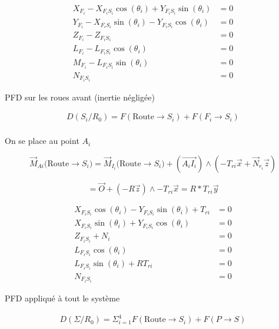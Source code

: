 \documentclass[a4paper,12pt]{report}  %
\begin{document}
\begin{align*}
	X_{F_i} - X_{F_iS_i} \cos(\theta_i) + Y_{F_iS_i} \sin(\theta_i) &= 0 \tag{7} \\
	Y_{F_i} - X_{F_iS_i} \sin(\theta_i) - Y_{F_iS_i} \cos(\theta_i) &= 0 \tag{8} \\
	Z_{F_i} - Z_{F_iS_i} &= 0 \tag{9} \\
	L_{F_i} - L_{F_iS_i} \cos(\theta_i) &= 0 \tag{10} \\
	M_{F_i} - L_{F_iS_i} \sin(\theta_i) &= 0 \tag{11} \\
	N_{F_iS_i} &= 0 \tag{12}
\end{align*}




PFD sur les roues avant (inertie négligée)



\begin{align*}
	D(S_i/R_0) = {F}(\text{Route} \rightarrow S_i) + {F}(F_i \rightarrow S_i) \\
\end{align*}



On se place au point $A_i$



$$
\vec{M}_{Ai}({\text{Route} \rightarrow S_i)} = \vec{M}_{I_i}({\text{Route}\rightarrow S_i)} + \left( \overrightarrow{A_iI_i} \right) \wedge (-{T}_{ri}\vec{x} + \vec{N}_{r_i} \vec{z})
$$

$$ 
= \vec{O} + ({-R}\vec{z})\wedge-T_{ri}\vec{x} = R *T_{ri}\vec{y}
$$




\begin{align*}
	X_{F_iS_i} \cos(\theta_i) - Y_{F_iS_i} \sin(\theta_i) + T_{ri} &= 0 \tag{13} \\
	X_{F_iS_i}\sin(\theta_i) + Y_{F_iS_i} \cos(\theta_i)&= 0 \tag{14} \\
	Z_{F_iS_i} + N_i &= 0 \tag{15} \\
	L_{F_iS_i} \cos(\theta_i) &= 0 \tag{16} \\
	L_{F_iS_i} \sin(\theta_i) + R T_{ri} &= 0 \tag{17} \\
	N_{F_iS_i} &= 0 \tag{18}
\end{align*}




PFD appliqué à tout le système



\begin{align*}
	D(\Sigma/R_0) = \Sigma_{i=1}^{4}{F}(\text{Route} \rightarrow S_i) + {F}(P \rightarrow S) \\
\end{align*}
\end{document}
